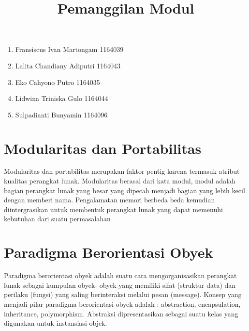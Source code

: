 \documentclass[12pt,a4paper]{article}
\begin{document}
\title{Pemanggilan Modul}
\maketitle
\begin{enumerate}
\item Fransiscus Ivan Martongam      1164039 \\
\item Lalita Chandiany Adiputri      1164043\\
\item Eko Cahyono Putro              1164035\\
\item Lidwina Triniska Gulo          1164044\\
\item Sulpadianti Bunyamin           1164096\\
\end{enumerate}

\section{Modularitas dan Portabilitas}
Modularitas dan portabilitas merupakan faktor pentig karena termasuk atribut kualitas perangkat lunak. Modularitas berasal dari kata modul, modul adalah bagian perangkat lunak yang besar yang dipecah menjadi bagian yang lebih kecil dengan memberi nama. Pengalamatan memori berbeda beda kemudian diintergrasikan untuk membentuk perangkat lunak yang dapat memenuhi kebutuhan dari suatu permasalahan

\section{Paradigma Berorientasi Obyek}
Paradigma berorientasi obyek adalah suatu cara mengorganisasikan perangkat lunak sebagai kumpulan obyek- obyek yang memiliki sifat (struktur data) dan perilaku (fungsi) yang saling berinteraksi melalui pesan (message). Konsep yang menjadi pilar paradigma berorientasi obyek adalah : abstraction, encapsulation, inheritance, polymorphism. Abstraksi dipresentasikan sebagai suatu kelas yang digunakan untuk instansiasi objek.
\end{document}
